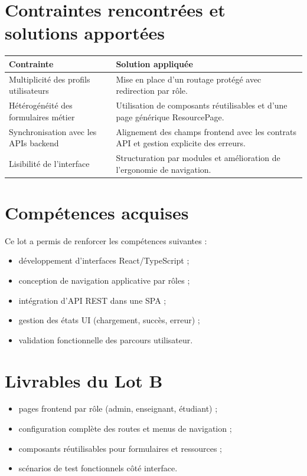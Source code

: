 \section{Contraintes rencontrées et solutions apportées}
\begin{tabularx}{\textwidth}{lX}
\toprule
\textbf{Contrainte} & \textbf{Solution appliquée} \\
\midrule
Multiplicité des profils utilisateurs & Mise en place d'un routage protégé avec redirection par rôle. \\
Hétérogénéité des formulaires métier & Utilisation de composants réutilisables et d'une page générique ResourcePage. \\
Synchronisation avec les APIs backend & Alignement des champs frontend avec les contrats API et gestion explicite des erreurs. \\
Lisibilité de l'interface & Structuration par modules et amélioration de l'ergonomie de navigation. \\
\bottomrule
\end{tabularx}

\section{Compétences acquises}
Ce lot a permis de renforcer les compétences suivantes :
\begin{itemize}
  \item développement d'interfaces React/TypeScript ;
  \item conception de navigation applicative par rôles ;
  \item intégration d'API REST dans une SPA ;
  \item gestion des états UI (chargement, succès, erreur) ;
  \item validation fonctionnelle des parcours utilisateur.
\end{itemize}

\section{Livrables du Lot B}
\begin{itemize}
  \item pages frontend par rôle (admin, enseignant, étudiant) ;
  \item configuration complète des routes et menus de navigation ;
  \item composants réutilisables pour formulaires et ressources ;
  \item scénarios de test fonctionnels côté interface.
\end{itemize}

